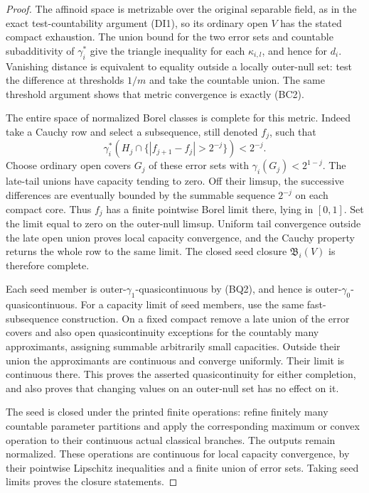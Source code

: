 \documentclass[11pt,a4paper]{article}
\numberwithin{equation}{section}
\theoremstyle{definition}
\theoremstyle{remark}
\begin{document}
\begin{proof}
The affinoid space is metrizable over the original separable
field, as in the exact test-countability argument (DI1), so its
ordinary open $V$ has the stated compact exhaustion. The union
bound for the two error sets and countable subadditivity of
$\gamma_i^*$ give the triangle inequality for each
$\kappa_{i,l}$, and hence for $d_i$. Vanishing distance is
equivalent to equality outside a locally outer-null set: test
the difference at thresholds $1/m$ and take the countable union.
The same threshold argument shows that metric convergence is
exactly (BC2).

The entire space of normalized Borel classes is complete for
this metric. Indeed take a Cauchy row and select a subsequence,
still denoted $f_j$, such that
\[
 \gamma_i^*(H_j\cap\{|f_{j+1}-f_j|>2^{-j}\})<2^{-j}.
\]
Choose ordinary open covers $G_j$ of these error sets with
$\gamma_i(G_j)<2^{1-j}$. The late-tail unions have capacity
tending to zero. Off their limsup, the successive differences
are eventually bounded by the summable sequence $2^{-j}$ on
each compact core. Thus $f_j$ has a finite pointwise Borel
limit there, lying in $[0,1]$. Set the limit equal to zero on
the outer-null limsup. Uniform tail convergence outside the
late open union proves local capacity convergence, and the
Cauchy property returns the whole row to the same limit.
The closed seed closure $\mathfrak B_i(V)$ is therefore complete.

Each seed member is outer-$\gamma_1$-quasicontinuous by (BQ2),
and hence is outer-$\gamma_0$-quasicontinuous. For a capacity
limit of seed members, use the same fast-subsequence construction.
On a fixed compact remove a late union of the error covers and
also open quasicontinuity exceptions for the countably many
approximants, assigning summable arbitrarily small capacities.
Outside their union the approximants are continuous and converge
uniformly. Their limit is continuous there. This proves the
asserted quasicontinuity for either completion, and also proves
that changing values on an outer-null set has no effect on it.

The seed is closed under the printed finite operations: refine
finitely many countable parameter partitions and apply the
corresponding maximum or convex operation to their continuous
actual classical branches. The outputs remain normalized. These
operations are continuous for local capacity convergence, by
their pointwise Lipschitz inequalities and a finite union of
error sets. Taking seed limits proves the closure statements.
\end{proof}
\end{document}

